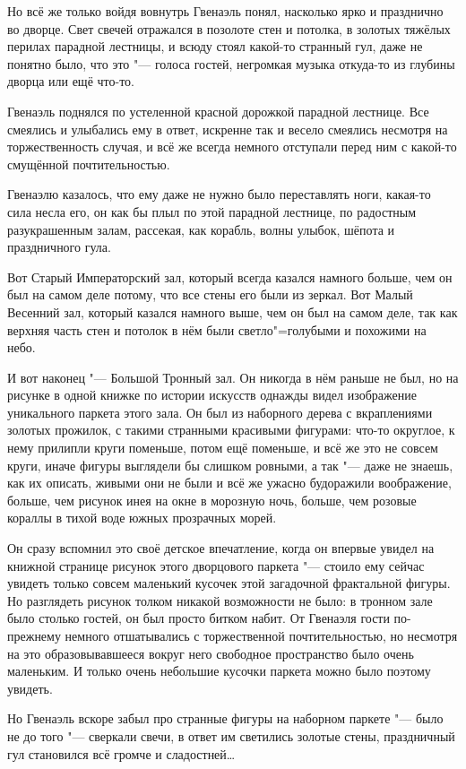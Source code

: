 Но всё же только войдя вовнутрь Гвенаэль понял, насколько ярко и празднично во
дворце.
Свет свечей отражался в позолоте стен и потолка, в золотых тяжёлых перилах
парадной лестницы, и всюду стоял какой-то странный гул, даже не понятно было,
что это "--- голоса гостей, негромкая музыка откуда-то из глубины дворца или ещё
что-то.

Гвенаэль поднялся по устеленной красной дорожкой парадной лестнице.
Все смеялись и улыбались ему в ответ, искренне так и весело смеялись несмотря на
торжественность случая, и всё же всегда немного отступали перед ним с какой-то
смущённой почтительностью.

Гвенаэлю казалось, что ему даже не нужно было переставлять ноги, какая-то сила
несла его, он как бы плыл по этой парадной лестнице, по радостным разукрашенным
залам, рассекая, как корабль, волны улыбок, шёпота и праздничного гула.

Вот Старый Императорский зал, который всегда казался намного больше, чем он был
на самом деле потому, что все стены его были из зеркал.
Вот Малый Весенний зал, который казался намного выше, чем он был на самом деле,
так как верхняя часть стен и потолок в нём были светло"=голубыми и похожими на
небо.

И вот наконец "--- Большой Тронный зал.
Он никогда в нём раньше не был, но на рисунке в одной книжке по истории искусств
однажды видел изображение уникального паркета этого зала.
Он был из наборного дерева с вкраплениями золотых прожилок, с такими странными
красивыми фигурами: что-то округлое, к нему прилипли круги поменьше, потом ещё
поменьше, и всё же это не совсем круги, иначе фигуры выглядели бы слишком
ровными, а так "--- даже не знаешь, как их описать, живыми они не были и всё же
ужасно будоражили воображение, больше, чем рисунок инея на окне в морозную ночь,
больше, чем розовые кораллы в тихой воде южных прозрачных морей.

Он сразу вспомнил это своё детское впечатление, когда он впервые увидел на
книжной странице рисунок этого дворцового паркета "--- стоило ему сейчас увидеть
только совсем маленький кусочек этой загадочной фрактальной фигуры.
Но разглядеть рисунок толком никакой возможности не было: в тронном зале было
столько гостей, он был просто битком набит. От Гвенаэля гости по-прежнему
немного отшатывались с торжественной почтительностью, но несмотря на это
образовывавшееся вокруг него свободное пространство было очень маленьким.
И только очень небольшие кусочки паркета можно было поэтому увидеть.

Но Гвенаэль вскоре забыл про странные фигуры на наборном паркете "--- было не до
того "--- сверкали свечи, в ответ им светились золотые стены, праздничный гул
становился всё громче и сладостней\ldots

